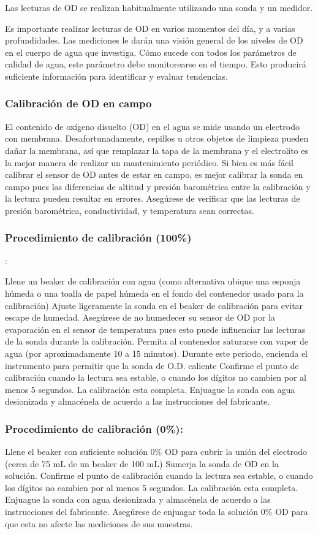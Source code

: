 Las lecturas de OD se realizan habitualmente utilizando una sonda y un medidor.

 
Es importante realizar lecturas de OD en varios momentos del día, y a varias profundidades. 
Las mediciones le darán una visión general de los niveles de OD en el cuerpo de agua que investiga. 
Cómo sucede con todos los parámetros de calidad de agua, este parámetro debe monitorearse en el tiempo. 
Esto producirá suficiente información para identificar y evaluar tendencias.

\subsubsection{Calibración de OD en campo}
El contenido de oxígeno disuelto (OD) en el agua se mide usando un electrodo con membrana. 
Desafortunadamente, cepillos u otros objetos de limpieza pueden dañar la membrana, así que remplazar la tapa de la membrana y el electrolito es la mejor manera de realizar un mantenimiento periódico. 
Si bien es más fácil calibrar el sensor de OD antes de estar en campo, es mejor calibrar la sonda en campo pues las diferencias de altitud y presión barométrica entre la calibración y la lectura pueden resultar en errores. 
Asegúrese de verificar que las lecturas de presión barométrica, conductividad, y temperatura sean correctas.

\subsubsection{Procedimiento de calibración (100\%)}:

Llene un beaker de calibración con agua (como alternativa ubique una esponja húmeda o una toalla de papel húmeda en el fondo del contenedor usado para la calibración)
Ajuste ligeramente la sonda en el beaker de calibración para evitar escape de humedad. 
Asegúrese de no humedecer su sensor de OD por la evaporación en el sensor de temperatura pues esto puede influenciar las lecturas de la sonda durante la calibración.
Permita al contenedor saturarse con vapor de agua (por aproximadamente 10 a 15 minutos). 
Durante este periodo, encienda el instrumento para permitir que la sonda de O.D. caliente
Confirme el punto de calibración cuando la lectura sea estable, o cuando los dígitos no cambien por al menos 5 segundos.
La calibración esta completa. 
Enjuague la sonda con agua desionizada y almacénela de acuerdo a las instrucciones del fabricante.

\subsubsection{Procedimiento de calibración (0\%):}
Llene el beaker con suficiente solución 0\% OD para cubrir la unión del electrodo (cerca de 75 mL de un beaker de 100 mL)
Sumerja la sonda de OD en la solución.
Confirme el punto de calibración cuando la lectura sea estable, o cuando los dígitos no cambien por al menos 5 segundos.
La calibración esta completa. 
Enjuague la sonda con agua desionizada y almacénela de acuerdo a las instrucciones del fabricante. 
Asegúrese de enjuagar toda la solución $0\%$ OD para que esta no afecte las mediciones de sus muestras.


